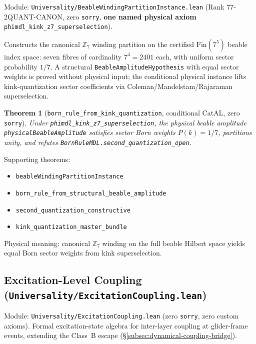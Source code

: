 \documentclass[11pt,a4paper]{article}
\newtheorem{theorem}{Theorem}[section]
\theoremstyle{definition}
\begin{document}
Module: \texttt{Universality/BeableWindingPartitionInstance.lean} (Rank
77-2QUANT-CANON, zero \lstinline|sorry|, \textbf{one named physical axiom}
\lstinline|phimdl_kink_z7_superselection|).

Constructs the canonical $\mathbb{Z}_7$ winding partition on the certified
$\mathrm{Fin}(7^5)$ beable index space: seven fibres of cardinality
$7^4 = 2401$ each, with uniform sector probability $1/7$.
A structural \lstinline|BeableAmplitudeHypothesis| with equal sector weights
is proved without physical input; the conditional physical instance lifts
kink-quantization sector coefficients via Coleman/Mandelstam/Rajaraman
superselection.

\begin{theorem}[\lstinline|born_rule_from_kink_quantization|, conditional CatAL, zero \texttt{sorry}]
Under \lstinline|phimdl_kink_z7_superselection|, the physical beable amplitude
\lstinline|physicalBeableAmplitude| satisfies sector Born weights
$P(k) = 1/7$, partitions unity, and refutes
\lstinline|BornRuleMDL.second_quantization_open|.
\end{theorem}

\noindent Supporting theorems:
\begin{itemize}[nosep,leftmargin=2em,topsep=2pt,parsep=0pt,partopsep=0pt]
\item \lstinline|beableWindingPartitionInstance|
\item \lstinline|born_rule_from_structural_beable_amplitude|
\item \lstinline|second_quantization_constructive|
\item \lstinline|kink_quantization_master_bundle|
\end{itemize}

Physical meaning: canonical $\mathbb{Z}_7$ winding on the full beable Hilbert
space yields equal Born sector weights from kink superselection.

\subsection{Excitation-Level Coupling
  (\texttt{Universality/ExcitationCoupling.lean})}\label{subsec:excitation-coupling}

Module: \texttt{Universality/ExcitationCoupling.lean} (zero
\lstinline|sorry|, zero custom axioms).
Formal excitation-state algebra for inter-layer coupling at glider-frame events,
extending the Class~B escape (\S\ref{subsec:dynamical-coupling-bridge}).
\end{document}
